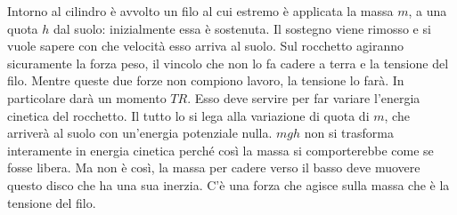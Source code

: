 \documentclass[10pt,a4paper]{book}
\begin{document}
\begin{figure}[htpb]
\end{figure}
\FloatBarrier
Intorno al cilindro è avvolto un filo al cui estremo è applicata la massa $m$, a una quota $h$ dal suolo: inizialmente essa è sostenuta. Il sostegno viene rimosso e si vuole sapere con che velocità esso arriva al suolo.
Sul rocchetto agiranno sicuramente la forza peso, il vincolo che non lo fa cadere a terra e la tensione del filo. Mentre queste due forze non compiono lavoro, la tensione lo farà. In particolare darà un momento $TR$. Esso deve servire per far variare l'energia cinetica del rocchetto. Il tutto lo si lega alla variazione di quota di $m$, che arriverà al suolo con un'energia potenziale nulla. $mgh$ non si trasforma interamente in energia cinetica perché così la massa si comporterebbe come se fosse libera. Ma non è così, la massa per cadere verso il basso deve muovere questo disco che ha una sua inerzia. C'è una forza che agisce sulla massa che è la tensione del filo.
\end{document}
